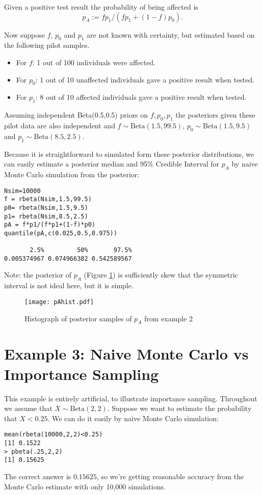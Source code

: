\documentclass[11pt]{article}
\def\B{\text{Beta}}
\begin{document}
Given a positive test result the probability of being affected is $$p_A := fp_1/ (fp_1+(1-f)p_0).$$

Now suppose $f$, $p_0$ and $p_1$ are not known with certainty, but estimated based on the following pilot samples. 
\begin{itemize}
\item For $f$: 1 out of 100 individuals were affected.
\item For $p_0$: 1 out of 10 unaffected individuals gave a positive result when tested.
\item For $p_1$: 8 out of 10 affected individuals gave a positive result when tested.
\end{itemize}

Assuming independent  Beta(0.5,0.5) priors on $f,p_0,p_1$ the posteriors given these pilot data are also independent and $f\sim \B(1.5,99.5)$, $p_0 \sim \B(1.5,9.5)$ and $p_1\sim \B(8.5,2.5)$.

Because it is straightforward to simulated form these posterior distributions, we can easily estimate a posterior median and 95\% Credible Interval for $p_A$ by naive Monte Carlo simulation from the posterior:
\begin{verbatim}
Nsim=10000
f = rbeta(Nsim,1.5,99.5)
p0= rbeta(Nsim,1.5,9.5)
p1= rbeta(Nsim,8.5,2.5)
pA = f*p1/(f*p1+(1-f)*p0)
quantile(pA,c(0.025,0.5,0.975))

       2.5%         50%       97.5% 
0.005374967 0.074966382 0.542589567 
\end{verbatim}
Note: the posterior of $p_A$ (Figure \ref{post.pA}) is sufficiently skew that the symmetric interval is not ideal here, but it is simple.
 
 \begin{figure}
 \texttt{[image: pAhist.pdf]}  \caption{Histograph of posterior samples of $p_A$ from example 2} \label{post.pA}

\end{figure}



\section{Example 3: Naive Monte Carlo vs Importance Sampling}

This example is entirely artificial, to illustrate importance sampling. Throughout we assume that $X \sim \B(2,2)$. Suppose we want to estimate the probability that $X<0.25$. We can do it easily by naive Monte Carlo simulation:
\begin{verbatim}
mean(rbeta(10000,2,2)<0.25)
[1] 0.1522
> pbeta(.25,2,2)
[1] 0.15625
\end{verbatim}
The correct answer is $0.15625$, so we're getting reasonable accuracy from the Monte Carlo estimate with only 10,000 simulations.
\end{document}
